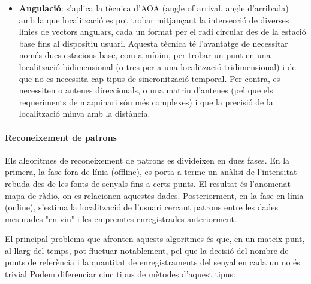 \begin{itemize}
\begin{itemize}
    \end{itemize}

    \item \textbf{Angulació}: s’aplica la tècnica d’AOA (angle of arrival, angle d'arribada) amb la que localització es pot trobar mitjançant la intersecció de diverses línies de vectors angulars, cada un format per el radi circular des de la estació base fins al dispositiu usuari. Aquesta tècnica té l'avantatge de necessitar només dues estacions base, com a mínim, per trobar un punt en una localització bidimensional (o tres per a una localització tridimensional) \cite{liu} i de que no es necessita cap tipus de sincronització temporal. Per contra, es necessiten o antenes direccionals, o una matriu d'antenes (pel que els requeriments de maquinari són més complexes) i que la precisió de la localització minva amb la distància.
    
\end{itemize}

\paragraph{Reconeixement de patrons}

Els algoritmes de reconeixement de patrons es divideixen en dues fases. En la primera, la fase fora de línia (offline), es porta a terme un anàlisi de l'intensitat rebuda des de les fonts de senyals fins a certs punts. El resultat és l’anomenat mapa de ràdio, on es relacionen aquestes dades. Posteriorment, en la fase en línia (online), s'estima la localització de l'usuari cercant patrons entre les dades mesurades "en viu" i les empremtes enregistrades anteriorment.

El principal problema que afronten aquests algoritmes és que, en un mateix punt, al llarg del temps, pot fluctuar notablement, pel que la decisió del nombre de punts de referència i la quantitat de enregistraments del senyal en cada un no és trivial \cite{bagosi}
Podem diferenciar cinc tipus de mètodes d'aquest tipus:

